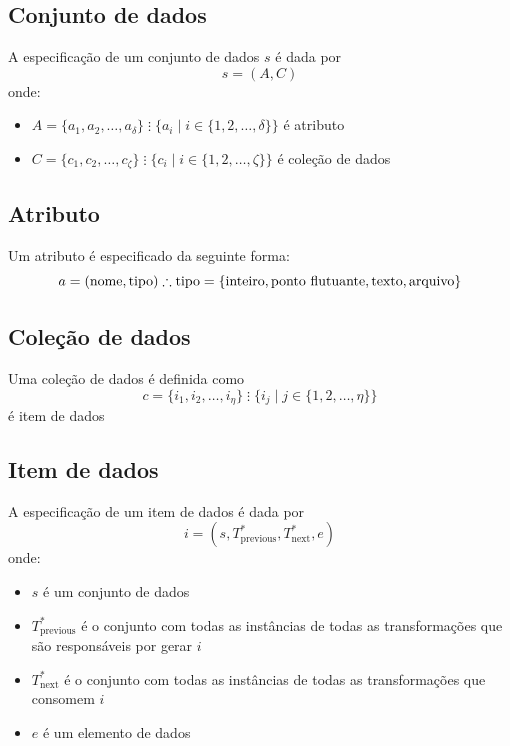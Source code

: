\subsection{Conjunto de dados}

A especificação de um conjunto de dados \( s \) é dada por \[ s = (A, C) \] onde:
\begin{itemize}
    \item \( A = \{a_1, a_2, \ldots, a_{\delta} \} \; \vdots{} \; \{ a_i \mid i \in \{1, 2, \ldots, \delta \} \} \) é atributo
    \item \( C = \{c_1, c_2, \ldots, c_{\zeta} \} \; \vdots{} \; \{ c_i \mid i \in \{1, 2, \ldots, \zeta \} \} \) é coleção de dados
\end{itemize}

\subsection{Atributo}

Um atributo é especificado da seguinte forma: \[ a = (\textrm{nome},\textrm{tipo}) \therefore \textrm{tipo} = \{\textup{inteiro}, \textup{ponto flutuante}, \textup{texto}, \textup{arquivo}\} \]

\subsection{Coleção de dados}

Uma coleção de dados é definida como \[ c = \{ i_1, i_2, \ldots, i_{\eta} \} \; \vdots \; \{ i_j \mid j \in \{ 1, 2, \ldots, \eta \} \} \] é item de dados

\subsection{Item de dados}

A especificação de um item de dados é dada por \[ i = (s, T^{\ast}_{\textrm{previous}}, T^{\ast}_{\textrm{next}}, e) \] onde:

\begin{itemize}
    \item \( s \) é um conjunto de dados
    \item \( T^{\ast}_{\textrm{previous}} \) é o conjunto com todas as instâncias de todas as transformações que são responsáveis por gerar \( i \)
    \item \( T^{\ast}_{\textrm{next}} \) é o conjunto com todas as instâncias de todas as transformações que consomem \( i \)
    \item \( e \) é um elemento de dados
\end{itemize}

